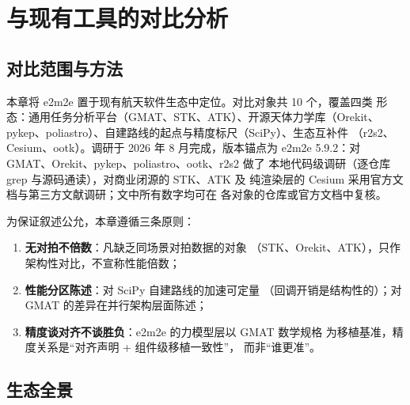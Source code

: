 \section{与现有工具的对比分析}
\label{sec:comparison}

\subsection{对比范围与方法}

本章将 e2m2e 置于现有航天软件生态中定位。对比对象共 10 个，覆盖四类
形态：通用任务分析平台（GMAT、STK、ATK）、开源天体力学库（Orekit、
pykep、poliastro）、自建路线的起点与精度标尺（SciPy）、生态互补件
（r2s2、Cesium、ootk）。调研于 2026 年 8 月完成，版本锚点为
e2m2e 5.9.2：对 GMAT、Orekit、pykep、poliastro、ootk、r2s2 做了
本地代码级调研（逐仓库 grep 与源码通读），对商业闭源的 STK、ATK 及
纯渲染层的 Cesium 采用官方文档与第三方文献调研；文中所有数字均可在
各对象的仓库或官方文档中复核。

为保证叙述公允，本章遵循三条原则：

\begin{enumerate}
  \item \textbf{无对拍不倍数}：凡缺乏同场景对拍数据的对象
        （STK、Orekit、ATK），只作架构性对比，不宣称性能倍数；
  \item \textbf{性能分区陈述}：对 SciPy 自建路线的加速可定量
        （回调开销是结构性的）；对 GMAT 的差异在并行架构层面陈述；
  \item \textbf{精度谈对齐不谈胜负}：e2m2e 的力模型层以 GMAT 数学规格
        为移植基准，精度关系是``对齐声明 + 组件级移植一致性''，
        而非``谁更准''。
\end{enumerate}

\subsection{生态全景}

